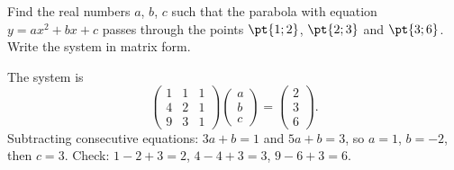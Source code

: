 \begin{exercise}
Find the real numbers $a$, $b$, $c$ such that the parabola with equation $y=ax^2+bx+c$ passes through the points $\pt{1;2}$, $\pt{2;3}$ and $\pt{3;6}$. Write the system in matrix form.
\end{exercise}
\begin{solution}
The system is \[\begin{pmatrix}1&1&1\\4&2&1\\9&3&1\end{pmatrix}\begin{pmatrix}a\\b\\c\end{pmatrix}=\begin{pmatrix}2\\3\\6\end{pmatrix}.\] Subtracting consecutive equations: $3a+b=1$ and $5a+b=3$, so $a=1$, $b=-2$, then $c=3$. Check: $1-2+3=2$, $4-4+3=3$, $9-6+3=6$.
\end{solution}

\mxnewpage
